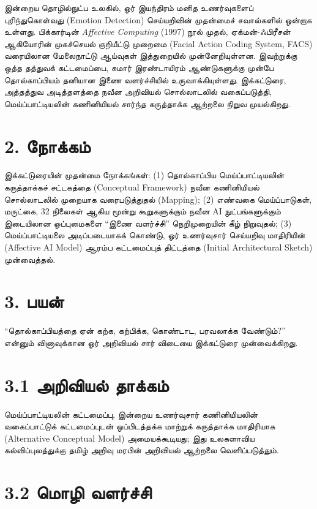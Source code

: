 \documentclass[journal,10pt,twocolumn]{IEEEtran}
\begin{document}
இன்றைய தொழில்நுட்ப உலகில், ஓர் இயந்திரம் மனித உணர்வுகளைப் புரிந்துகொள்வது (Emotion
Detection) செய்யறிவின் முதன்மைச் சவால்களில் ஒன்றாக உள்ளது. பிக்கார்டின்
\emph{Affective Computing} (1997) நூல் முதல், ஏக்மன்-ஃபிரீசன் ஆகியோரின்
முகச்செயல் குறியீட்டு முறைமை (Facial Action Coding System, FACS) வரையிலான
மேலைநாட்டு ஆய்வுகள் இத்துறையில் முன்னேறியுள்ளன. இவற்றுக்கு ஒத்த தத்துவக் கட்டமைப்பை,
சுமார் இரண்டாயிரம் ஆண்டுகளுக்கு முன்பே தொல்காப்பியம் தனியான இணை வளர்ச்சியில்
உருவாக்கியுள்ளது. இக்கட்டுரை, அத்தத்துவ அடித்தளத்தை நவீன அறிவியல் சொல்லாடலில்
வகைப்படுத்தி, மெய்ப்பாட்டியலின் கணினியியல் சார்ந்த கருத்தாக்க ஆற்றலை நிறுவ
முயல்கிறது.

\section{2. நோக்கம்}\label{uxba8uxb95uxb95uxbae}

இக்கட்டுரையின் முதன்மை நோக்கங்கள்: (1) தொல்காப்பிய மெய்ப்பாட்டியலின் கருத்தாக்கச்
சட்டகத்தை (Conceptual Framework) நவீன கணினியியல் சொல்லாடலில் முறையாக
வரைபடுத்துதல் (Mapping); (2) எண்வகை மெய்ப்பாடுகள், மருட்கை, 32 நிலைகள் ஆகிய
மூன்று கூறுகளுக்கும் நவீன AI நுட்பங்களுக்கும் இடையிலான ஒப்புமைகளை “இணை
வளர்ச்சி” நெறிமுறையின் கீழ் நிறுவுதல்; (3) மெய்ப்பாட்டியலை அடிப்படையாகக் கொண்டு,
ஓர் உணர்வுசார் செய்யறிவு மாதிரியின் (Affective AI Model) ஆரம்ப கட்டமைப்புத்
திட்டத்தை (Initial Architectural Sketch) முன்வைத்தல்.

\section{3. பயன்}\label{uxbaauxbafuxba9}

“தொல்காப்பியத்தை ஏன் கற்க, கற்பிக்க, கொண்டாட, பரவலாக்க வேண்டும்?” என்னும்
வினாவுக்கான ஓர் அறிவியல் சார் விடையை இக்கட்டுரை முன்வைக்கிறது.

\section{3.1 அறிவியல்
தாக்கம்}\label{uxb85uxbb1uxbb5uxbafuxbb2-uxba4uxb95uxb95uxbae}

மெய்ப்பாட்டியலின் கட்டமைப்பு, இன்றைய உணர்வுசார் கணினியியலின் வகைப்பாட்டுக் கட்டமைப்புடன்
ஒப்பிடத்தக்க மாற்றுக் கருத்தாக்க மாதிரியாக (Alternative Conceptual Model)
அமையக்கூடியது; இது உலகளாவிய கல்விப்புலத்துக்கு தமிழ் அறிவு மரபின் அறிவியல் ஆற்றலை
வெளிப்படுத்தும்.

\section{3.2 மொழி வளர்ச்சி}\label{uxbaeuxbb4-uxbb5uxbb3uxbb0uxb9auxb9a}
\end{document}
